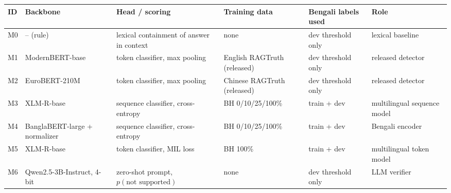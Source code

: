 \begin{tabular}{@{}l>{\raggedright}p{2.3cm}>{\raggedright}p{2.8cm}>{\raggedright}p{2.3cm}>{\raggedright}p{1.7cm}>{\raggedright\arraybackslash}p{1.9cm}@{}}
\toprule
ID & Backbone & Head / scoring & Training data & Bengali labels used & Role \tabularnewline
\midrule
M0 & -- (rule) & lexical containment of answer in context & none & dev threshold only & lexical baseline \tabularnewline
M1 & ModernBERT-base & token classifier, max pooling & English RAGTruth (released) & dev threshold only & released detector \tabularnewline
M2 & EuroBERT-210M & token classifier, max pooling & Chinese RAGTruth (released) & dev threshold only & released detector \tabularnewline
M3 & XLM-R-base & sequence classifier, cross-entropy & BH 0/10/25/100\% & train + dev & multilingual sequence model \tabularnewline
M4 & BanglaBERT-large + normalizer & sequence classifier, cross-entropy & BH 0/10/25/100\% & train + dev & Bengali encoder \tabularnewline
M5 & XLM-R-base & token classifier, MIL loss & BH 100\% & train + dev & multilingual token model \tabularnewline
M6 & Qwen2.5-3B-Instruct, 4-bit & zero-shot prompt, $p(\text{not supported})$ & none & dev threshold only & LLM verifier \tabularnewline
\bottomrule
\end{tabular}
